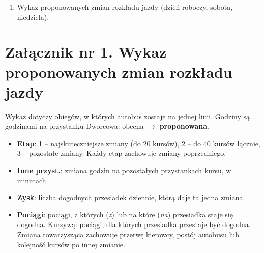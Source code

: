 \documentclass[11pt,a4paper]{article}
\newcommand{\Tytul}[1]{\par\smallskip{\bfseries #1}\par}
\begin{document}
\Tytul{Załączniki}
\begin{enumerate}
\item Wykaz proponowanych zmian rozkładu jazdy (dzień roboczy, sobota, niedziela).
\end{enumerate}

\newpage
\section*{Załącznik nr 1. Wykaz proponowanych zmian rozkładu jazdy}

Wykaz dotyczy obiegów, w których autobus zostaje na jednej linii. Godziny są godzinami na przystanku Dworcowa: obecna $\to$ \textbf{proponowana}.
\begin{itemize}[itemsep=1pt]
\item \textbf{Etap}: 1 -- najskuteczniejsze zmiany (do 20 kursów), 2 -- do 40 kursów łącznie, 3 -- pozostałe zmiany. Każdy etap zachowuje zmiany poprzedniego.
\item \textbf{Inne przyst.}: zmiana godzin na pozostałych przystankach kursu, w minutach.
\item \textbf{Zysk}: liczba dogodnych przesiadek dziennie, którą daje ta jedna zmiana.
\item \textbf{Pociągi}: pociągi, z których (\emph{z}) lub na które (\emph{na}) przesiadka staje się dogodna. Kursywą: pociągi, dla których przesiadka przestaje być dogodna. Zmiana towarzysząca zachowuje przerwę kierowcy, postój autobusu lub kolejność kursów po innej zmianie.
\end{itemize}

{\footnotesize
\setlength{\tabcolsep}{3pt}
\renewcommand{\arraystretch}{1.15}

}
\end{document}
